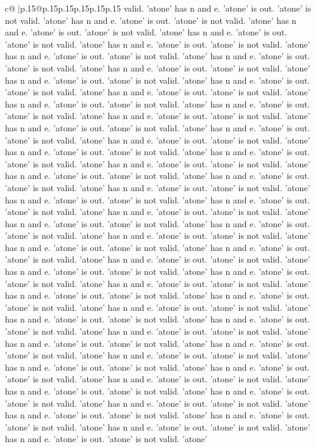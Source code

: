 \documentclass{article}
\begin{document}
{\begin{supertabular}{c@{$\;$}|p{.15\linewidth}@{}p{.15\linewidth}p{.15\linewidth}p{.15\linewidth}p{.15\linewidth}p{.15\linewidth}}
{{{valid. 'atone' has n and e. 'atone' is out. 'atone' is not valid. 'atone' has n and e. 'atone' is out. 'atone' is not valid. 'atone' has n and e. 'atone' is out. 'atone' is not valid. 'atone' has n and e. 'atone' is out. 'atone' is not valid. 'atone' has n and e. 'atone' is out. 'atone' is not valid. 'atone' has n and e. 'atone' is out. 'atone' is not valid. 'atone' has n and e. 'atone' is out. 'atone' is not valid. 'atone' has n and e. 'atone' is out. 'atone' is not valid. 'atone' has n and e. 'atone' is out. 'atone' is not valid. 'atone' has n and e. 'atone' is out. 'atone' is not valid. 'atone' has n and e. 'atone' is out. 'atone' is not valid. 'atone' has n and e. 'atone' is out. 'atone' is not valid. 'atone' has n and e. 'atone' is out. 'atone' is not valid. 'atone' has n and e. 'atone' is out. 'atone' is not valid. 'atone' has n and e. 'atone' is out. 'atone' is not valid. 'atone' has n and e. 'atone' is out. 'atone' is not valid. 'atone' has n and e. 'atone' is out. 'atone' is not valid. 'atone' has n and e. 'atone' is out. 'atone' is not valid. 'atone' has n and e. 'atone' is out. 'atone' is not valid. 'atone' has n and e. 'atone' is out. 'atone' is not valid. 'atone' has n and e. 'atone' is out. 'atone' is not valid. 'atone' has n and e. 'atone' is out. 'atone' is not valid. 'atone' has n and e. 'atone' is out. 'atone' is not valid. 'atone' has n and e. 'atone' is out. 'atone' is not valid. 'atone' has n and e. 'atone' is out. 'atone' is not valid. 'atone' has n and e. 'atone' is out. 'atone' is not valid. 'atone' has n and e. 'atone' is out. 'atone' is not valid. 'atone' has n and e. 'atone' is out. 'atone' is not valid. 'atone' has n and e. 'atone' is out. 'atone' is not valid. 'atone' has n and e. 'atone' is out. 'atone' is not valid. 'atone' has n and e. 'atone' is out. 'atone' is not valid. 'atone' has n and e. 'atone' is out. 'atone' is not valid. 'atone' has n and e. 'atone' is out. 'atone' is not valid. 'atone' has n and e. 'atone' is out. 'atone' is not valid. 'atone' has n and e. 'atone' is out. 'atone' is not valid. 'atone' has n and e. 'atone' is out. 'atone' is not valid. 'atone' has n and e. 'atone' is out. 'atone' is not valid. 'atone' has n and e. 'atone' is out. 'atone' is not valid. 'atone' has n and e. 'atone' is out. 'atone' is not valid. 'atone' has n and e. 'atone' is out. 'atone' is not valid. 'atone' has n and e. 'atone' is out. 'atone' is not valid. 'atone' has n and e. 'atone' is out. 'atone' is not valid. 'atone' has n and e. 'atone' is out. 'atone' is not valid. 'atone' has n and e. 'atone' is out. 'atone' is not valid. 'atone' has n and e. 'atone' is out. 'atone' is not valid. 'atone' has n and e. 'atone' is out. 'atone' is not valid. 'atone' has n and e. 'atone' is out. 'atone' is not valid. 'atone' has n and e. 'atone' is out. 'atone' is not valid. 'atone' has n and e. 'atone' is out. 'atone' is not valid. 'atone' has n and e. 'atone' is out. 'atone' is not valid. 'atone' has n and e. 'atone' is out. 'atone' is not valid. 'atone' has n and e. 'atone' is out. 'atone' is not valid. 'atone' has n and e. 'atone' is out. 'atone' is not valid. 'atone' has n and e. 'atone' is out. 'atone' is not valid. 'atone' }}}
\end{supertabular}}
\end{document}
